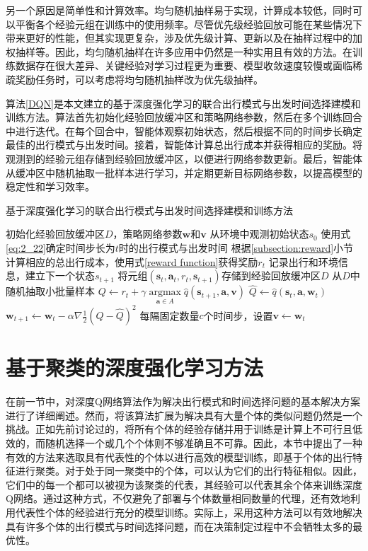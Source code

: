 另一个原因是简单性和计算效率。均匀随机抽样易于实现，计算成本较低，同时可以平衡各个经验元组在训练中的使用频率。尽管优先级经验回放可能在某些情况下带来更好的性能，但其实现更复杂，涉及优先级计算、更新以及在抽样过程中的加权抽样等。因此，均匀随机抽样在许多应用中仍然是一种实用且有效的方法。在训练数据存在很大差异、关键经验对学习过程更为重要、模型收敛速度较慢或面临稀疏奖励任务时，可以考虑将均匀随机抽样改为优先级抽样。

算法\ref{DQN}是本文建立的基于深度强化学习的联合出行模式与出发时间选择建模和训练方法。算法首先初始化经验回放缓冲区和策略网络参数，然后在多个训练回合中进行迭代。在每个回合中，智能体观察初始状态，然后根据不同的时间步长确定最佳的出行模式与出发时间。接着，智能体计算总出行成本并获得相应的奖励。将观测到的经验元组存储到经验回放缓冲区，以便进行网络参数更新。最后，智能体从缓冲区中随机抽取一批样本进行学习，并定期更新目标网络参数，以提高模型的稳定性和学习效率。

\begin{algorithm}
\caption{基于深度强化学习的联合出行模式与出发时间选择建模和训练方法}\label{DQN}
\begin{algorithmic}
\State 初始化经验回放缓冲区$D$，策略网络参数$\mathbf{w}$和$\mathbf{v}$
    \State 从环境中观测初始状态$s_0$
        \State 使用式\ref{eq:2_22}确定时间步长为$t$时的出行模式与出发时间
        \State 根据\ref{subsection:reward}小节计算相应的总出行成本，使用式\ref{reward function}获得奖励$r_t$
        \State 记录出行和环境信息，建立下一个状态$s_{t+1}$
        \State 将元组$(\bm{s}_t,\bm{a}_t,r_t,\bm{s}_{t+1})$存储到经验回放缓冲区$D$
        \State 从$D$中随机抽取小批量样本
        \State ${Q} \leftarrow r_t + \gamma \mathop{\operatorname{argmax}}\limits_{\bm{a} \in A}\hat{q}\left(\bm{s}_{t+1}, \bm{a}, \mathbf{v}\right)$
        \State $\hat{Q} \leftarrow \hat{q}\left(\bm{s}_{t}, \bm{a}, \mathbf{w}_{t}\right)$
        \State $\mathbf{w}_{t+1} \leftarrow \mathbf{w}_{t}-\alpha \nabla \frac{1}{2}(Q-\hat{Q})^{2}$
        \State 每隔固定数量$c$个时间步，设置$\mathbf{v} \leftarrow \mathbf{w}_t$
    \EndFor
\EndFor
\end{algorithmic}
\end{algorithm}


\section{基于聚类的深度强化学习方法}
\label{sec:4_3}

在前一节中，对深度Q网络算法作为解决出行模式和时间选择问题的基本解决方案进行了详细阐述。然而，将该算法扩展为解决具有大量个体的类似问题仍然是一个挑战。正如先前讨论过的，将所有个体的经验存储并用于训练是计算上不可行且低效的，而随机选择一个或几个个体则不够准确且不可靠。因此，本节中提出了一种有效的方法来选取具有代表性的个体以进行高效的模型训练，即基于个体的出行特征进行聚类。对于处于同一聚类中的个体，可以认为它们的出行特征相似。因此，它们中的每一个都可以被视为该聚类的代表，其经验可以代表其余个体来训练深度Q网络。通过这种方式，不仅避免了部署与个体数量相同数量的代理，还有效地利用代表性个体的经验进行充分的模型训练。实际上，采用这种方法可以有效地解决具有许多个体的出行模式与时间选择问题，而在决策制定过程中不会牺牲太多的最优性。


